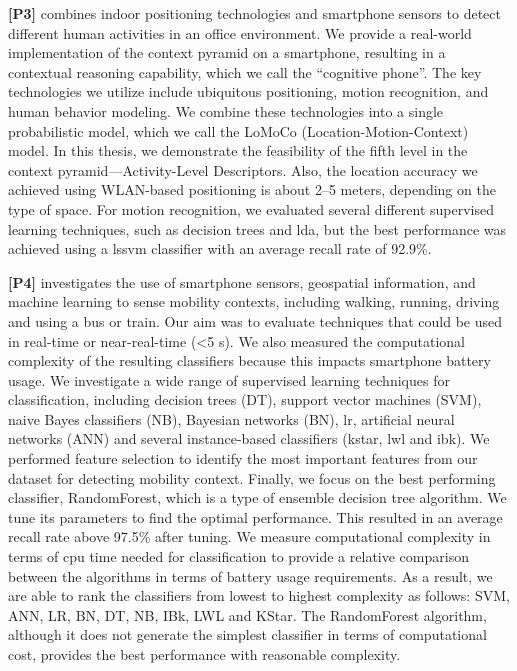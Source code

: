 \textbf{[P3]} combines indoor positioning technologies and smartphone sensors to detect different human activities in an office environment. We provide a real-world implementation of the context pyramid on a smartphone, resulting in a contextual reasoning capability, which we call the ``cognitive phone''. The key technologies we utilize include ubiquitous positioning, motion recognition, and human behavior modeling. We combine these technologies into a single probabilistic model, which we call the LoMoCo (Location-Motion-Context) model. In this thesis, we demonstrate the feasibility of the fifth level in the context pyramid---Activity-Level Descriptors. Also, the location accuracy we achieved using WLAN-based positioning is about 2--5 meters, depending on the type of space. For motion recognition, we evaluated several different supervised learning techniques, such as decision trees and \gls{lda}, but the best performance was achieved using a \gls{lssvm} classifier with an average recall rate of 92.9\%.

\textbf{[P4]} investigates the use of smartphone sensors, geospatial information, and machine learning to sense mobility contexts, including walking, running, driving and using a bus or train. Our aim was to evaluate techniques that could be used  in real-time or  near-real-time (<5 s). We also measured the computational complexity of the resulting classifiers because this impacts smartphone battery usage. We investigate a wide range of supervised learning techniques for
classification, including decision trees (DT), support vector machines (SVM), naive Bayes classifiers (NB), Bayesian networks (BN), \gls{lr}, artificial neural networks (ANN) and several instance-based classifiers (\acrshort{kstar}, \acrshort{lwl} and \acrshort{ibk}). We performed feature selection to identify the most important features from our dataset for detecting mobility context. Finally, we focus on the best performing classifier, RandomForest, which is a type of ensemble decision tree algorithm. We tune its parameters to find the optimal performance. This resulted in an average recall rate above 97.5\% after tuning. We measure computational complexity in terms of \gls{cpu} time needed for classification to provide a relative comparison between the algorithms in terms of battery usage requirements. As a result, we are able to rank the classifiers from lowest to highest complexity as follows: SVM, ANN, LR, BN, DT, NB, IBk, LWL and KStar. The RandomForest algorithm, although it does not generate the simplest classifier in terms of computational cost, provides the best performance with reasonable complexity.

